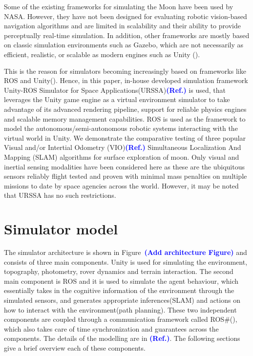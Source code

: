\documentclass[a4paper, 10pt, conference]{ieeeconf}      %
\newcommand\coltxt[2]{\textbf{\textcolor{#1}{(#2)}}}
\newcommand\msm[1]{\coltxt{blue}{#1}}
\begin{document}
Some of the existing frameworks for simulating the Moon have been used by NASA\cite{allan2019planetary}. However,  they have not been designed for evaluating robotic vision-based navigation algorithms and are limited in scalability and their ability to provide perceptually real-time simulation. In addition, other frameworks are mostly based on classic simulation environments such as Gazebo\cite{koenig2004design}, which are not necessarily as efficient, realistic, or scalable as modern engines such as Unity (\cite{engine2008unity, konrad2019simulation}). 

This is the reason for simulators becoming increasingly based on frameworks like ROS\cite{quigley2009ros} and Unity(\cite{babaians2018ros2unity3d,bischoffm_2019_06}). Hence, in this paper, in-house developed simulation framework Unity-ROS Simulator for Space Applications(URSSA)\msm{Ref.} is used, that leverages the Unity game engine as a virtual environment simulator to take advantage of its advanced rendering pipeline, support for reliable physics engines and scalable memory management capabilities. ROS is used as the framework to model the autonomous/semi-autonomous robotic systems interacting with the virtual world in Unity. We demonstrate the comparative testing of three popular Visual and/or Intertial Odometry (VIO)\msm{Ref.} Simultaneous Localization And Mapping (SLAM) algorithms for surface exploration of moon. Only visual and inertial sensing modalities have been considered here as these are the ubiquitous sensors reliably flight tested and proven with minimal mass penalties on multiple missions to date by space agencies across the world. However, it may be noted that URSSA has no such restrictions.

\section{Simulator model}
The simulator architecture is shown in Figure~\msm{Add architecture Figure} and consists of three main components. Unity is used for simulating the environment, topography, photometry, rover dynamics and terrain interaction. The second main component is ROS and it is used to simulate the agent behaviour, which essentially takes in the cognitive information of the environment through the simulated sensors, and generates appropriate inferences(SLAM) and actions on how to interact with the environment(path planning). These two independent components are coupled through a communication framework called ROS\#(\cite{bischoffm_2019_06}), which also takes care of time synchronization and guarantees across the components. The details of the modelling are in \msm{Ref.}. The following sections give a brief overview each of these components.
\end{document}
